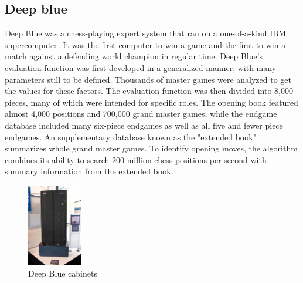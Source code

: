 \documentclass[10pt,twocolumn]{article}
\begin{document}
\subsection{Deep blue}
    Deep Blue was a chess-playing expert system that ran on a one-of-a-kind IBM supercomputer. It was the first computer to win a game and the first to win a match against a defending world champion in regular time.
    Deep Blue's evaluation function was first developed in a generalized manner, with many parameters still to be defined. Thousands of master games were analyzed to get the values for these factors. The evaluation function was then divided into 8,000 pieces, many of which were intended for specific roles. The opening book featured almost 4,000 positions and 700,000 grand master games, while the endgame database included many six-piece endgames as well as all five and fewer piece endgames. An supplementary database known as the "extended book" summarizes whole grand master games. To identify opening moves, the algorithm combines its ability to search 200 million chess positions per second with summary information from the extended book. \cite{DeepBlue}
    \begin{figure}
        \includegraphics[width=90]{Deep_Blue.jpg}
        \caption{Deep Blue cabinets}
        \label{fig2:Deep Blue}
    \end{figure}
    
\end{document}
